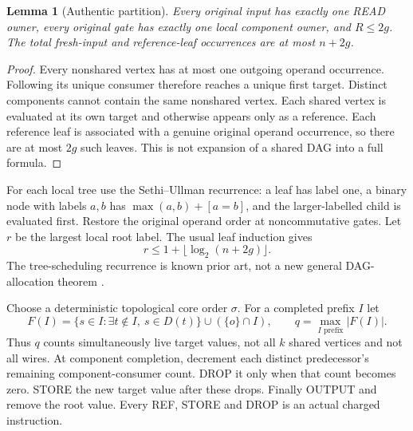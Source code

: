 \documentclass[11pt]{article}
\newtheorem{lemma}{Lemma}
\begin{document}
\begin{lemma}[Authentic partition]
Every original input has exactly one READ owner, every original gate has exactly one local component owner, and $R\le2g$. The total fresh-input and reference-leaf occurrences are at most $n+2g$.
\end{lemma}
\begin{proof}
Every nonshared vertex has at most one outgoing operand occurrence. Following its unique consumer therefore reaches a unique first target. Distinct components cannot contain the same nonshared vertex. Each shared vertex is evaluated at its own target and otherwise appears only as a reference. Each reference leaf is associated with a genuine original operand occurrence, so there are at most $2g$ such leaves. This is not expansion of a shared DAG into a full formula.
\end{proof}

For each local tree use the Sethi--Ullman recurrence: a leaf has label one, a binary node with labels $a,b$ has $\max(a,b)+[a=b]$, and the larger-labelled child is evaluated first. Restore the original operand order at noncommutative gates. Let $r$ be the largest local root label. The usual leaf induction gives
\[
 r\le 1+\lfloor\log_2(n+2g)\rfloor.
\]
The tree-scheduling recurrence is known prior art, not a new general DAG-allocation theorem \cite{sethi,appel}.

Choose a deterministic topological core order $\sigma$. For a completed prefix $I$ let
\[
 F(I)=\{s\in I:\exists t\notin I,\ s\in D(t)\}
       \cup (\{o\}\cap I),\qquad q=\max_{I\text{ prefix}}|F(I)|.
\]
Thus $q$ counts simultaneously live target values, not all $k$ shared vertices and not all wires. At component completion, decrement each distinct predecessor's remaining component-consumer count. DROP it only when that count becomes zero. STORE the new target value after these drops. Finally OUTPUT and remove the root value. Every REF, STORE and DROP is an actual charged instruction.
\end{document}
